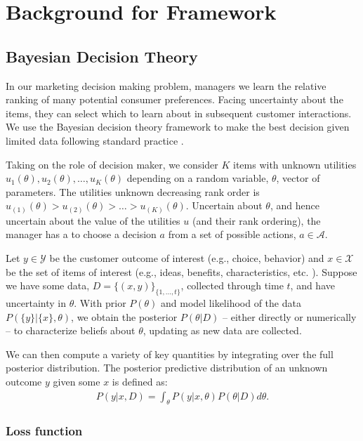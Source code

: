 \documentclass[nonblindrev]{informs3}
\newcommand{\numitems}{K}
\begin{document}
\section{Background for Framework}

\subsection{Bayesian Decision Theory}

In our marketing decision making problem, managers we learn the relative ranking of many potential consumer preferences. Facing uncertainty about the items, they can select which to learn about in subsequent customer interactions. We use the Bayesian decision theory framework to make the best decision given limited data following standard practice \citep{GelmanEtAl2004}. 

Taking on the role of decision maker, we consider $\numitems$ items with unknown utilities $u_1(\theta),u_2(\theta), \ldots, u_\numitems(\theta)$ depending on a random variable, $\theta$,  vector of parameters. The utilities unknown decreasing rank order is $u_{(1)}(\theta) > u_{(2)}(\theta) > \ldots > u_{(\numitems)}(\theta)$. Uncertain about $\theta$, and hence uncertain about the value of the utilities $u$ (and their rank ordering), the manager has a to choose a decision $a$ from a set of possible actions, $a \in \mathcal{A}$. 


Let $y \in \mathcal{Y}$ be the customer outcome of interest (e.g., choice, behavior) and $x \in \mathcal{X}$ be the set of items of interest (e.g., ideas, benefits, characteristics, etc. ). Suppose we have some data, $D = \{(x,y)\}_{\{1,...,t\}}$, collected through time $t$, and have uncertainty in $\theta$. With prior $P(\theta)$ and model likelihood of the data $P(\{y\}|\{x\},\theta)$, we obtain the posterior $P(\theta|D)$ -- either directly or numerically -- to characterize beliefs about $\theta$, updating as new data are collected.

We can then compute a variety of key quantities by integrating over the full posterior distribution. The posterior predictive distribution of an unknown outcome $y$ given some $x$ is defined as:
\begin{align} 
P(y|x,D) = \int_\theta P(y|x,\theta)P(\theta|D)d\theta .
\end{align}

\subsubsection{Loss function}
\end{document}
